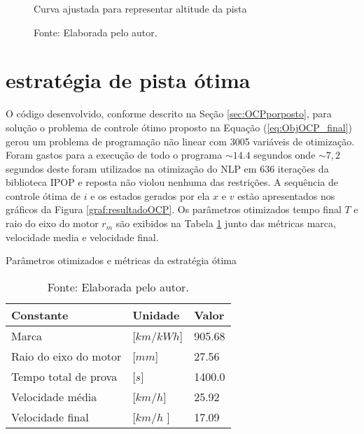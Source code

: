 \begin{figure}[h]
    \centering
    \caption{Curva ajustada para representar altitude da pista}
    
    \label{graf:modelo_pista}
    \caption*{\footnotesize{Fonte: Elaborada pelo autor.}}
\end{figure}


%     

%     

\section{estratégia de pista ótima}
\label{sec:resultados_otimo}
 
O código desenvolvido, conforme descrito na Seção \ref{sec:OCPporposto}, para solução o problema de controle ótimo proposto na Equação 
(\ref{eq:ObjOCP_final}) gerou um problema de programação não linear com 3005 variáveis de otimização.
Foram gastos para a execução de todo o programa $\sim 14.4$ segundos onde $\sim 7,2$ segundos deste foram utilizados na otimização do NLP em $636$ iterações da biblioteca IPOP e reposta não violou nenhuma das restrições. 
A sequência de controle ótima de $i$ e os estados gerados por ela $x$ e $v$ estão apresentados nos gráficos da Figura \ref{graf:resultadoOCP}. 
Os parâmetros otimizados tempo final $T$ e raio do eixo do motor $r_m$ são exibidos na Tabela \ref{tab:resultadoOCP} junto das métricas marca, velocidade media e velocidade final. 

\begin{table}[h]
	\centering
	\caption{Parâmetros otimizados e métricas da estratégia ótima}
	\begin{tabular}{lll}
		\toprule
		\textbf{Constante} & \textbf{Unidade} & \textbf{Valor}\\
		\hline
		Marca                               & [$km/kWh$]   & 905.68  \\
        Raio do eixo do motor               & [$mm$]       & 27.56   \\
        Tempo total de prova                & [$s$]        & 1400.0  \\  
        Velocidade média                    & [$km/h$]     & 25.92   \\
        Velocidade final                    & [$km/h$ ]    & 17.09   \\
		\bottomrule
	\end{tabular}
	\caption*{\footnotesize Fonte: Elaborada pelo autor.}
	\label{tab:resultadoOCP}
\end{table}

